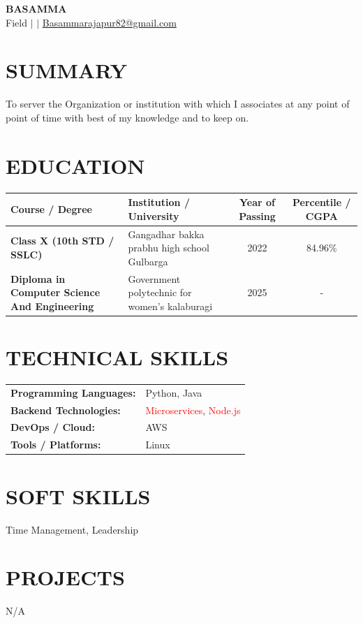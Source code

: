 \documentclass[8.5pt,a4paper]{extarticle}
\begin{document}
\begin{center}
{\large \textbf{BASAMMA}} \\ \vspace{1pt}
{\footnotesize Field \quad $|$  \quad $|$ \quad \href{mailto:Basammarajapur82@gmail.com}{Basammarajapur82@gmail.com}}
\end{center}

\section*{SUMMARY}
{\small To server the Organization or institution with which I associates at any point of point of time with best of my knowledge and to keep on.}

\section*{EDUCATION}
{\small {\small
\renewcommand{\arraystretch}{1.18}
\noindent\begin{tabularx}{\textwidth}{|p{1.7in}|X|c|c|}
\hline
\textbf{Course / Degree} & \textbf{Institution / University} & \textbf{Year of Passing} & \textbf{Percentile / CGPA} \\ \hline
\textbf{Class X (10th STD / SSLC)} & Gangadhar bakka prabhu high school Gulbarga & 2022 & 84.96\% \\ \hline
\textbf{Diploma in Computer Science And Engineering} & Government polytechnic for women's kalaburagi & 2025 & - \\ \hline
\end{tabularx}
}\vspace{4pt}

}
\section*{TECHNICAL SKILLS}
\small
\begin{tabular}{@{}p{2.2in}p{5.1in}@{}}
\textbf{Programming Languages:} & Python, Java \\
\textbf{Backend Technologies:} & \textcolor{red}{Microservices}, \textcolor{red}{Node.js} \\
\textbf{DevOps / Cloud:} & AWS \\
\textbf{Tools / Platforms:} & Linux \\
\end{tabular}

\section*{SOFT SKILLS}
\noindent Time Management, Leadership \vspace{4pt}



\section*{PROJECTS}
{\small N/A

}
\end{document}
